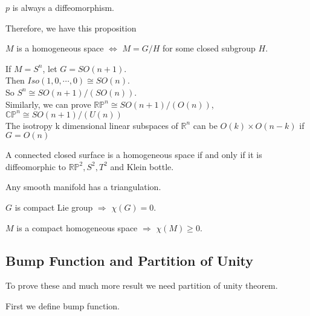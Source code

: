 \begin{theorem}
     $ p  $ is always a diffeomorphism.
\end{theorem}
Therefore, we have this proposition
\begin{proposition}
    $ M  $ is a homogeneous space  $ \Leftrightarrow  $  $ M=G/H  $ for some closed subgroup  $ H  $.
\end{proposition}
\begin{example}
    If  $ M=S^n  $, let  $ G=SO(n+1)  $.\\
    Then  $ Iso(1,0,\cdots,0)\cong SO(n) $.\\
    So  $ S^n\cong SO(n+1)/(SO(n)) $. \\
    Similarly, we can prove  $ \mathbb{RP}^n\cong SO(n+1)/(O(n)) $,  $ \mathbb{CP}^n\cong SO(n+1)/(U(n))$\\
    The isotropy k dimensional linear subspaces of  $ \mathbb{R}^n  $ can be  $ O(k)\times O(n-k) $ if  $ G=O
    (n) $   
\end{example}
A connected closed surface is a homogeneous space if and only if it is diffeomorphic to  $ \mathbb{RP}^2,S^2,T^2 $ and Klein bottle. 
\begin{theorem}[Whithead]
    Any smooth manifold has a triangulation.
\end{theorem}
\begin{theorem}
     $ G  $ is compact Lie group  $ \Rightarrow  $  $ \chi(G)=0 $. 
\end{theorem}
\begin{theorem}[Mostow2005]
     $ M  $ is a compact homogeneous space  $ \Rightarrow  $  $ \chi(M) \geq 0 $. 
\end{theorem}
\subsection{Bump Function and Partition of Unity}
To prove these and much more result we need partition of unity theorem.

First we define bump function.
